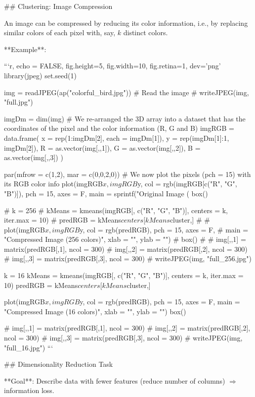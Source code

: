 ## Clustering: Image Compression

An image can be compressed by reducing its color information, i.e., by replacing similar colors of each pixel with, say, $k$ distinct colors.

**Example**:

```{r, echo = FALSE, fig.height=5, fig.width=10, fig.retina=1, dev='png'}
library(jpeg)
set.seed(1)

img = readJPEG(ap("colorful_bird.jpg")) # Read the image
# writeJPEG(img, "full.jpg")

imgDm = dim(img)
# We re-arranged the 3D array into a dataset that has the coordinates of the pixel and the color information (R, G and B)
imgRGB = data.frame(
  x = rep(1:imgDm[2], each = imgDm[1]),
  y = rep(imgDm[1]:1, imgDm[2]),
  R = as.vector(img[,,1]),
  G = as.vector(img[,,2]),
  B = as.vector(img[,,3])
)

par(mfrow = c(1,2), mar = c(0,0,2,0))
# We now plot the pixels (pch = 15) with its RGB color info
plot(imgRGB$x, imgRGB$y, col = rgb(imgRGB[c("R", "G", "B")]), pch = 15, axes = F,
  main = sprintf("Original Image (%
box()

# k = 256
# kMeans = kmeans(imgRGB[, c("R", "G", "B")], centers = k, iter.max = 10)
# predRGB = kMeans$centers[kMeans$cluster,]
#
# plot(imgRGB$x, imgRGB$y, col = rgb(predRGB), pch = 15, axes = F,
#   main = "Compressed Image (256 colors)", xlab = "", ylab = "")
# box()
#
# img[,,1] = matrix(predRGB[,1], ncol = 300)
# img[,,2] = matrix(predRGB[,2], ncol = 300)
# img[,,3] = matrix(predRGB[,3], ncol = 300)
# writeJPEG(img, "full_256.jpg")

k = 16
kMeans = kmeans(imgRGB[, c("R", "G", "B")], centers = k, iter.max = 10)
predRGB = kMeans$centers[kMeans$cluster,]

plot(imgRGB$x, imgRGB$y, col = rgb(predRGB), pch = 15, axes = F,
  main = "Compressed Image (16 colors)", xlab = "", ylab = "")
box()

# img[,,1] = matrix(predRGB[,1], ncol = 300)
# img[,,2] = matrix(predRGB[,2], ncol = 300)
# img[,,3] = matrix(predRGB[,3], ncol = 300)
# writeJPEG(img, "full_16.jpg")
```



## Dimensionality Reduction Task

**Goal**: Describe data with fewer features (reduce number of columns) $\Rightarrow$ information loss.

